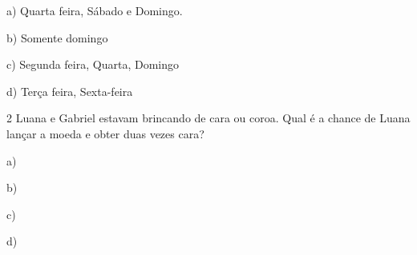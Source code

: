 a) Quarta feira, Sábado e Domingo.

b) Somente domingo

c) Segunda feira, Quarta, Domingo

d) Terça feira, Sexta-feira



\num{2} Luana e Gabriel estavam brincando de cara ou coroa. Qual é a chance
de Luana lançar a moeda e obter duas vezes cara?

a) 

b) 

c)  

d) 




